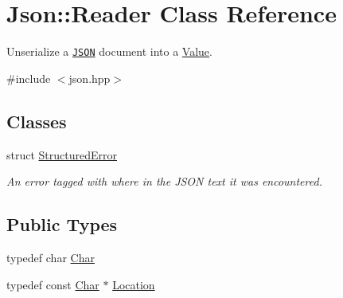 \hypertarget{class_json_1_1_reader}{\section{Json\-:\-:Reader Class Reference}
\label{class_json_1_1_reader}
}


Unserialize a \href{http://www.json.org}{\tt J\-S\-O\-N} document into a \hyperlink{class_json_1_1_value}{Value}.  




{\ttfamily \#include $<$json.\-hpp$>$}

\subsection*{Classes}
\begin{DoxyCompactItemize}
\item 
struct \hyperlink{struct_json_1_1_reader_1_1_structured_error}{Structured\-Error}
\begin{DoxyCompactList}\small\item\em An error tagged with where in the J\-S\-O\-N text it was encountered. \end{DoxyCompactList}\end{DoxyCompactItemize}
\subsection*{Public Types}
\begin{DoxyCompactItemize}
\item 
typedef char \hyperlink{class_json_1_1_reader_a3eec9118f3e9a672ba8348c3a79d0f45}{Char}
\item 
typedef const \hyperlink{class_json_1_1_reader_a3eec9118f3e9a672ba8348c3a79d0f45}{Char} $\ast$ \hyperlink{class_json_1_1_reader_a46795b5b272bf79a7730e406cb96375a}{Location}
\end{DoxyCompactItemize}
